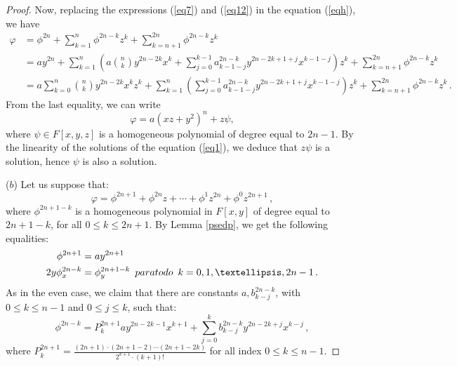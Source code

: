 \documentclass[10pt,a4paper]{amsart}
\begin{document}
\begin{proof}
	Now, replacing the expressions (\ref{eq7}) and (\ref{eq12}) in the equation (\ref{eqh}), we have  
	\begin{align*}
		\varphi
		&=\phi^{2n}+\sum_{k=1}^{n}\phi^{2n-k}z^k+\sum_{k=n+1}^{2n}\phi^{2n-k}z^k\nonumber\\
		&=ay^{2n}+ \sum_{k=1}^n \left(a\binom{n}{k}y^{2n-2k}x^k+\sum_{j=0}^{k-1} a^{2n-k}_{k-1-j}y^{2n-2k+1+j}x^{k-1-j}\right)z^k +\sum_{k=n+1}^{2n}\phi^{2n-k}z^k\\
		&=a\sum_{k=0}^{n}\binom{n}{k}y^{2n-2k}x^kz^k+ \sum_{k=1}^{n}\left(\sum_{j=0}^{k-1} a^{2n-k}_{k-1-j}y^{2n-2k+1+j}x^{k-1-j}\right)z^k+\sum_{k=n+1}^{2n}\phi^{2n-k}z^k\,.
	\end{align*}
	From  the last equality, we can write
	\begin{equation*}
		\varphi=a(xz+y^2)^n+z\psi, 
	\end{equation*}
	where $\psi\in F[x,y,z]$ is a homogeneous polynomial of degree equal to $2n-1$. By the linearity of the solutions of the equation (\ref{eq1}), we deduce that $z\psi$ is a solution, hence $\psi$ is also a solution.
	
	($b$) Let us suppose that: 
	\begin{equation}\label{eqhi1}
		\varphi=\phi^{2n+1}+\phi^{2n}z+\cdots+\phi^{1}z^{2n}+\phi^0z^{2n+1}\,,
	\end{equation}
	where $\phi^{2n+1-k}$ is a homogeneous  polynomial in $ F[x,y]$ of  degree equal to $2n+1-k$, for all $0\leq k\leq 2n+1$.  By Lemma \ref{psedp}, we get the following equalities:  
	\begin{align}	
		\phi^{2n+1}&=ay^{2n+1}\label{eqi7}\\	
		2y\phi^{2n-k}_x&=\phi^{2n+1-k}_y\,\,\, \textnormal{para todo}\,\,\, k=0,1,\dots, 2n-1\,.\label{eqi8}
	\end{align}
	As in the even case, we claim that there are constants $a,b_{k-j}^{2n-k}$,  with $0\leq k\leq n-1$ and $0\leq j\leq k$, such that:
	\begin{equation}\label{eqodd}
		\phi^{2n-k}=P^{2n+1}_{k}ay^{2n-2k-1}x^{k+1}+\sum_{j=0}^{k}b^{2n-k}_{k-j}y^{2n-2k+j}x^{k-j}\,,
	\end{equation}
	where 
	$
	P^{2n+1}_{k}=\frac{(2n+1)\cdot(2n+1-2)\cdots (2n+1-2k)}{2^{k+1}\cdot (k+1)!}
	$
	for all index $0\leq k\leq n-1$. 
	

\end{proof}
\end{document}
